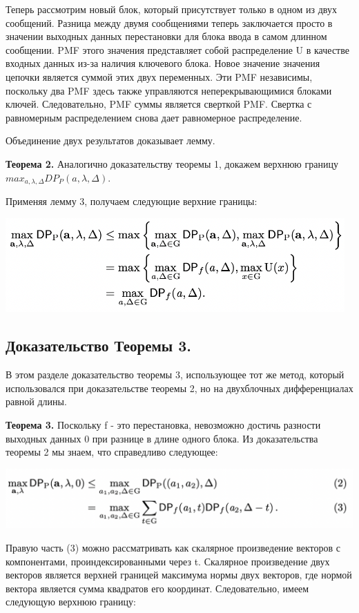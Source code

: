 \documentclass[utf8,14pt,a4paper,oneside,russian]{book}
\begin{document}
Теперь рассмотрим новый блок, который присутствует только в одном из двух 
сообщений. Разница между двумя сообщениями теперь заключается просто в 
значении выходных данных перестановки для блока ввода в самом длинном 
сообщении. PMF этого значения представляет собой распределение U в качестве 
входных данных из-за наличия ключевого блока. Новое значение значения цепочки 
является суммой этих двух переменных. Эти PMF независимы, поскольку два PMF 
здесь также управляются неперекрывающимися блоками ключей. Следовательно, 
PMF суммы является сверткой PMF. Свертка с равномерным распределением 
снова дает равномерное распределение.

Объединение двух результатов доказывает лемму.

\textbf{Теорема 2.} Аналогично доказательству теоремы 1, докажем верхнюю 
границу $max_{a,\lambda,\Delta} DP_P(a, \lambda, \Delta)$.

Применяя лемму 3, получаем следующие верхние границы:

\includegraphics[width=13cm]{form17}

\subsection{Доказательство Теоремы 3.}

В этом разделе доказательство теоремы 3, использующее тот же метод, 
который использовался при доказательстве теоремы 2, но на двухблочных 
дифференциалах равной длины.

\textbf{Теорема 3.} Поскольку f - это перестановка, невозможно достичь 
разности выходных данных 0 при разнице в длине одного блока. Из 
доказательства теоремы 2 мы знаем, что справедливо следующее:

\includegraphics[width=15cm]{form18}

Правую часть (3) можно рассматривать как скалярное произведение 
векторов с компонентами, проиндексированными через t. Скалярное 
произведение двух векторов является верхней границей максимума 
нормы двух векторов, где нормой вектора является сумма квадратов 
его координат. Следовательно, имеем следующую верхнюю границу:
\end{document}
